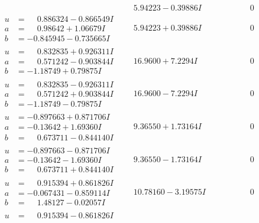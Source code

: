 \documentclass[1p]{elsarticle_modified}
\theoremstyle{definition}
\begin{document}
$$\begin{array}{c|c|c}
 & \phantom{-}5.94223 - 0.39886 I & \phantom{-0.000000 } 0 \\ \hline\begin{aligned}
u &= \phantom{-}0.886324 - 0.866549 I \\
a &= \phantom{-}0.98642 + 1.06679 I \\
b &= -0.845945 - 0.735665 I\end{aligned}
 & \phantom{-}5.94223 + 0.39886 I & \phantom{-0.000000 } 0 \\ \hline\begin{aligned}
u &= \phantom{-}0.832835 + 0.926311 I \\
a &= \phantom{-}0.571242 - 0.903844 I \\
b &= -1.18749 + 0.79875 I\end{aligned}
 & \phantom{-}16.9600 + 7.2294 I & \phantom{-0.000000 } 0 \\ \hline\begin{aligned}
u &= \phantom{-}0.832835 - 0.926311 I \\
a &= \phantom{-}0.571242 + 0.903844 I \\
b &= -1.18749 - 0.79875 I\end{aligned}
 & \phantom{-}16.9600 - 7.2294 I & \phantom{-0.000000 } 0 \\ \hline\begin{aligned}
u &= -0.897663 + 0.871706 I \\
a &= -0.13642 + 1.69360 I \\
b &= \phantom{-}0.673711 - 0.844140 I\end{aligned}
 & \phantom{-}9.36550 + 1.73164 I & \phantom{-0.000000 } 0 \\ \hline\begin{aligned}
u &= -0.897663 - 0.871706 I \\
a &= -0.13642 - 1.69360 I \\
b &= \phantom{-}0.673711 + 0.844140 I\end{aligned}
 & \phantom{-}9.36550 - 1.73164 I & \phantom{-0.000000 } 0 \\ \hline\begin{aligned}
u &= \phantom{-}0.915394 + 0.861826 I \\
a &= -0.067431 - 0.859114 I \\
b &= \phantom{-}1.48127 - 0.02057 I\end{aligned}
 & \phantom{-}10.78160 - 3.19575 I & \phantom{-0.000000 } 0 \\ \hline\begin{aligned}
u &= \phantom{-}0.915394 - 0.861826 I \\

\end{aligned}
\end{array}$$
\end{document}
